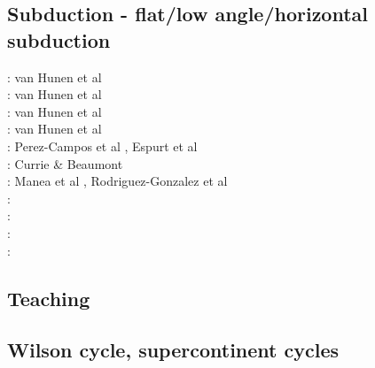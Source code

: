 \subsection{Subduction - flat/low angle/horizontal subduction}

\begin{scriptsize}
\twothousand: van Hunen et al \cite{vavv00}\\
\twothousandone: van Hunen et al \cite{vavv01}\\
\twothousandtwo: van Hunen et al \cite{vavv02,vavv02b}\\
\twothousandfour: van Hunen et al \cite{vavv04d}\\
\twothousandeight: Perez-Campos et al \cite{pekh08}, Espurt et al \cite{esfm08}\\
\twothousandeleven: Currie \& Beaumont \cite{cube11}\\
\twothousandtwelve: Manea et al \cite{mapm12}, Rodriguez-Gonzalez et al \cite{ronb12}\\
\twothousandfifteen: \cite{gehm15}\cite{tarn15}\cite{ealw15}\\
\twothousandsixteen: \cite{chdf16}\cite{huwc16}\cite{hulh16}\\
\twothousandnineteen: \cite{sifg19}\cite{sams19b}\cite{malg19}\\
\twothousandtwenty: \cite{dawl20}
\end{scriptsize}

\subsection{Teaching} 

\begin{scriptsize}
\cite{grap11}
\cite{kerh14}
\cite{bemg19}
\end{scriptsize}


\subsection{Wilson cycle, supercontinent cycles}


